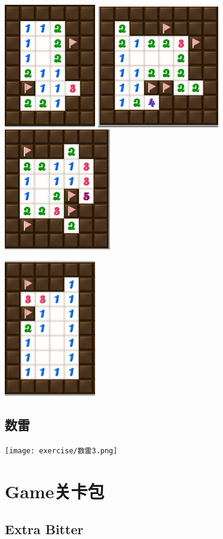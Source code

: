 \begin{center}
    \includegraphics[width=0.3\textwidth]{exercise/环8.png}\quad
    \includegraphics[width=0.4\textwidth]{exercise/环9.png}\quad
    \includegraphics[width=0.35\textwidth]{exercise/环14.png}
    
    \includegraphics[width=0.3\textwidth]{exercise/环11.png}
\end{center}

\subsection{数雷}
\begin{center}
    \texttt{[image: exercise/数雷3.png]}
\end{center}

\section{Game关卡包}
\subsection{Extra Bitter}
